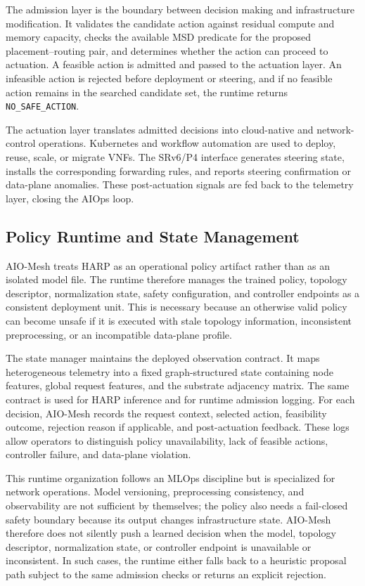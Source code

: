 \documentclass[final,5p]{elsarticle}
\newcommand{\rev}[1]{\textcolor{revisiongreen}{#1}}
\begin{document}
The admission layer is the boundary between decision making and infrastructure modification. It validates the candidate action against residual compute and memory capacity, \rev{checks the available MSD predicate for the proposed placement--routing pair}, and determines whether the action can proceed to actuation. A feasible action is admitted and passed to the actuation layer. An infeasible action is rejected before deployment or steering, and if no feasible action remains \rev{in the searched candidate set}, the runtime returns \texttt{NO\_SAFE\_ACTION}.

The actuation layer translates admitted decisions into cloud-native and network-control operations. Kubernetes and workflow automation are used to deploy, reuse, scale, or migrate VNFs. The SRv6/P4 interface generates steering state, installs the corresponding forwarding rules, and reports steering confirmation or data-plane anomalies. These post-actuation signals are fed back to the telemetry layer, closing the AIOps loop.

\subsection{Policy Runtime and State Management}
\label{subsec:policy_runtime}

AIO-Mesh treats HARP as an operational policy artifact rather than as an isolated model file. The runtime therefore manages the trained policy, topology descriptor, normalization state, safety configuration, and controller endpoints as a consistent deployment unit. This is necessary because an otherwise valid policy can become unsafe if it is executed with stale topology information, inconsistent preprocessing, or an incompatible data-plane profile.

The state manager maintains the deployed observation contract. It maps heterogeneous telemetry into a fixed graph-structured state containing node features, global request features, and the substrate adjacency matrix. The same contract is used for HARP inference and for runtime admission logging. For each decision, AIO-Mesh records the request context, selected action, feasibility outcome, rejection reason if applicable, and post-actuation feedback. These logs allow operators to distinguish policy unavailability, lack of feasible actions, controller failure, and data-plane violation.

This runtime organization follows an MLOps discipline but is specialized for network operations. Model versioning, preprocessing consistency, and observability are not sufficient by themselves; the policy also needs a fail-closed safety boundary because its output changes infrastructure state. AIO-Mesh therefore does not silently push a learned decision when the model, topology descriptor, normalization state, or controller endpoint is unavailable or inconsistent. In such cases, the runtime either falls back to a heuristic proposal path subject to the same admission checks or returns an explicit rejection.
\end{document}
